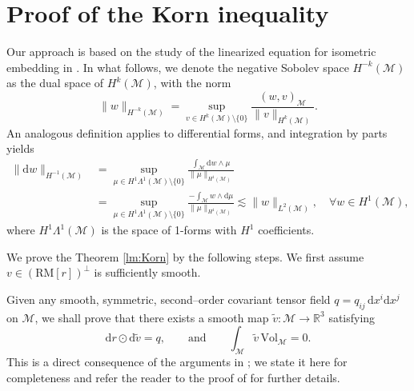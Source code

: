 \documentclass[11pt,a4paper,oneside,reqno]{amsart}
\theoremstyle{definition}
\theoremstyle{plain}
\numberwithin{theorem}{section}
\numberwithin{proposition}{section}
\numberwithin{lemma}{section}
\numberwithin{equation}{section}
\newcommand{\Man}{\mathcal{M}}
\newcommand{\RM}{\mathrm{RM}}
\newcommand{\Vol}{\mathrm{Vol}}
\begin{document}
\section{Proof of the Korn inequality} \label{appendix:Korn}



Our approach is based on the study of the linearized equation for isometric embedding in \cite[Lemma 9.2.2]{han2006isometric}. In what follows, we denote the negative Sobolev space $H^{-k}(\Man)$ as the dual space of $H^{k}(\Man)$, with the norm
\[ \| w \|_{H^{-k}(\Man)} = \sup_{v \in H^{k}(\Man) \setminus \{0\}} \frac{(w, v)_{\Man}}{\|v\|_{H^k(\Man)}}. \]
An analogous definition applies to differential forms, and integration by parts yields
\begin{equation}\label{eq:esti_H-1} 
\begin{aligned}
    \| \mathrm{d} w \|_{H^{-1}(\Man)} &= \sup_{\mu \in H^1\Lambda^1(\Man)\setminus \{0\}} 
\frac{\int_{\Man} \mathrm{d} w \wedge \mu}{\| \mu \|_{H^1(\Man)} }  \\ 
& = \sup_{\mu \in H^1\Lambda^1(\Man)\setminus \{0\}} \frac{-\int_{\Man}  w \wedge \mathrm{d} \mu}{\| \mu \|_{H^1(\Man)} } 
\lesssim \| w \|_{L^2(\Man)}, \quad \forall w \in H^1(\Man),
\end{aligned}
\end{equation} 
where $H^1\Lambda^1(\Man)$ is the space of 1-forms with $H^1$ coefficients.

\smallskip

We prove the Theorem \ref{lm:Korn} by the following steps. We first assume $v\in (\RM[r])^{\perp}$ is sufficiently smooth.

Given any smooth, symmetric, second–order covariant tensor field 
$q = q_{ij}\,\mathrm{d}x^i \mathrm{d}x^j$ on $\Man$, we shall prove that there exists 
a smooth map $\tilde{v}:\Man \rightarrow \mathbb{R}^3$ satisfying 
\begin{equation}\label{eq:drdv} 
    \mathrm{d} r \odot \mathrm{d} \tilde{v} = q,
\qquad\text{and}\qquad
\int_{\Man} \tilde{v}\,\Vol_{\Man} = 0.
\end{equation} 
This is a direct consequence of the arguments in 
\cite[Lemma~9.2.2]{han2006isometric}; we state it here for completeness and 
refer the reader to the proof of \cite[Lemma~9.2.2]{han2006isometric} for further details.
\end{document}
